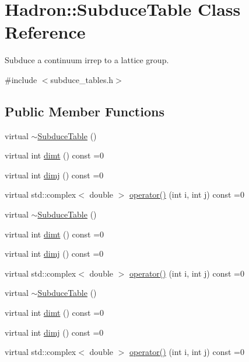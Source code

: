 \hypertarget{classHadron_1_1SubduceTable}{}\section{Hadron\+:\+:Subduce\+Table Class Reference}
\label{classHadron_1_1SubduceTable}


Subduce a continuum irrep to a lattice group.  




{\ttfamily \#include $<$subduce\+\_\+tables.\+h$>$}

\subsection*{Public Member Functions}
\begin{DoxyCompactItemize}
\item 
virtual \mbox{\hyperlink{classHadron_1_1SubduceTable_ab43812f8f47879aedcd5c26941f7cbee}{$\sim$\+Subduce\+Table}} ()
\item 
virtual int \mbox{\hyperlink{classHadron_1_1SubduceTable_ae5940873c5cc8054de1ce2fdc0ffd723}{dimt}} () const =0
\item 
virtual int \mbox{\hyperlink{classHadron_1_1SubduceTable_a04d125e8e09b85787472c3dbb4c93059}{dimj}} () const =0
\item 
virtual std\+::complex$<$ double $>$ \mbox{\hyperlink{classHadron_1_1SubduceTable_a999cf73415a42ed70a12a5c49dc24b0f}{operator()}} (int i, int j) const =0
\item 
virtual \mbox{\hyperlink{classHadron_1_1SubduceTable_ab43812f8f47879aedcd5c26941f7cbee}{$\sim$\+Subduce\+Table}} ()
\item 
virtual int \mbox{\hyperlink{classHadron_1_1SubduceTable_ae5940873c5cc8054de1ce2fdc0ffd723}{dimt}} () const =0
\item 
virtual int \mbox{\hyperlink{classHadron_1_1SubduceTable_a04d125e8e09b85787472c3dbb4c93059}{dimj}} () const =0
\item 
virtual std\+::complex$<$ double $>$ \mbox{\hyperlink{classHadron_1_1SubduceTable_a999cf73415a42ed70a12a5c49dc24b0f}{operator()}} (int i, int j) const =0
\item 
virtual \mbox{\hyperlink{classHadron_1_1SubduceTable_ab43812f8f47879aedcd5c26941f7cbee}{$\sim$\+Subduce\+Table}} ()
\item 
virtual int \mbox{\hyperlink{classHadron_1_1SubduceTable_ae5940873c5cc8054de1ce2fdc0ffd723}{dimt}} () const =0
\item 
virtual int \mbox{\hyperlink{classHadron_1_1SubduceTable_a04d125e8e09b85787472c3dbb4c93059}{dimj}} () const =0
\item 
virtual std\+::complex$<$ double $>$ \mbox{\hyperlink{classHadron_1_1SubduceTable_a999cf73415a42ed70a12a5c49dc24b0f}{operator()}} (int i, int j) const =0
\end{DoxyCompactItemize}



